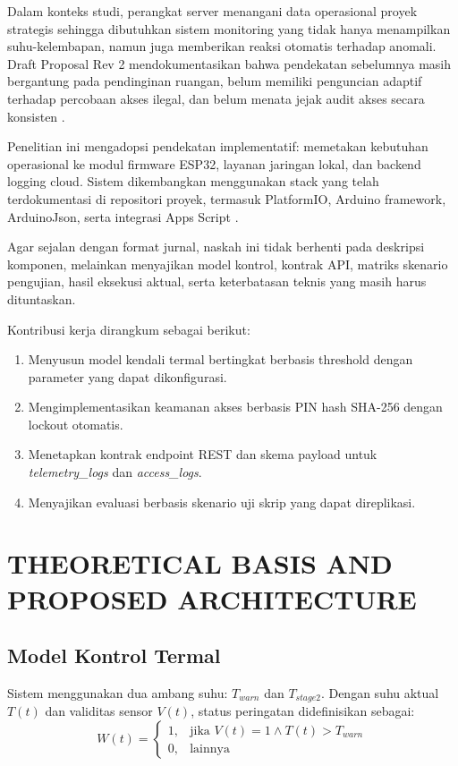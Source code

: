 \documentclass[10pt,a4paper,twocolumn]{article}
\begin{document}
Dalam konteks studi, perangkat server menangani data operasional proyek strategis sehingga dibutuhkan sistem monitoring yang tidak hanya menampilkan suhu-kelembapan, namun juga memberikan reaksi otomatis terhadap anomali. Draft Proposal Rev 2 mendokumentasikan bahwa pendekatan sebelumnya masih bergantung pada pendinginan ruangan, belum memiliki penguncian adaptif terhadap percobaan akses ilegal, dan belum menata jejak audit akses secara konsisten \cite{proposal_rev2_2026}.

Penelitian ini mengadopsi pendekatan implementatif: memetakan kebutuhan operasional ke modul firmware ESP32, layanan jaringan lokal, dan backend logging cloud. Sistem dikembangkan menggunakan stack yang telah terdokumentasi di repositori proyek, termasuk PlatformIO, Arduino framework, ArduinoJson, serta integrasi Apps Script \cite{repo_readme_2026,repo_firmware_2026,platformio_docs,arduinojson_docs}.

Agar sejalan dengan format jurnal, naskah ini tidak berhenti pada deskripsi komponen, melainkan menyajikan model kontrol, kontrak API, matriks skenario pengujian, hasil eksekusi aktual, serta keterbatasan teknis yang masih harus dituntaskan.

Kontribusi kerja dirangkum sebagai berikut:
\begin{enumerate}[leftmargin=*,nosep]
\item Menyusun model kendali termal bertingkat berbasis threshold dengan parameter yang dapat dikonfigurasi.
\item Mengimplementasikan keamanan akses berbasis PIN hash SHA-256 dengan lockout otomatis.
\item Menetapkan kontrak endpoint REST dan skema payload untuk \textit{telemetry\_logs} dan \textit{access\_logs}.
\item Menyajikan evaluasi berbasis skenario uji skrip yang dapat direplikasi.
\end{enumerate}

\section{THEORETICAL BASIS AND PROPOSED ARCHITECTURE}
\subsection{Model Kontrol Termal}
Sistem menggunakan dua ambang suhu: $T_{warn}$ dan $T_{stage2}$. Dengan suhu aktual $T(t)$ dan validitas sensor $V(t)$, status peringatan didefinisikan sebagai:
\begin{equation}
W(t)=
\begin{cases}
1,& \text{jika } V(t)=1 \land T(t)>T_{warn}\\
0,& \text{lainnya}
\end{cases}
\end{equation}
\end{document}

